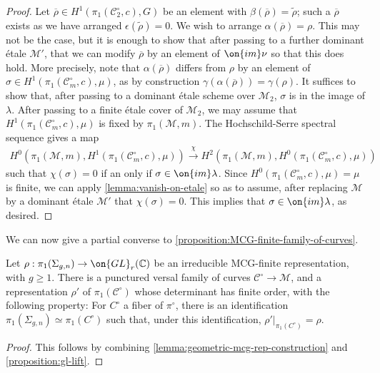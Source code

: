 \begin{proof}
Let $\overline{\rho} \in H^1(\pi_1(\mathscr C_2^\circ, c), G)$
be an element with $\beta(\overline{\rho}) = \widetilde{\rho}$; such a $\overline{\rho}$ exists as we have arranged $\epsilon(\widetilde{\rho})=0$.
We wish to arrange $\alpha(\overline{\rho}) =\rho$.
This may not be the case, but it is enough to show that after passing to a further dominant
\'etale $\mathscr M'$,
that we can modify $\overline{\rho}$ by an element of $\on{im}\nu$ so that this
does hold.
More precisely, note that $\alpha(\overline{\rho})$ differs from $\rho$ by an
element of $\sigma\in H^1(\pi_1(\mathscr{C}^\circ_m, c), \mu)$, as by
construction $\gamma(\alpha(\overline{\rho}))=\gamma(\rho)$. It suffices to show
that, after passing to a dominant \'etale scheme over $\mathscr{M}_2$, $\sigma$ is in the image of $\lambda$. After passing to a finite \'etale cover of $\mathscr{M}_2$, we may assume that $H^1(\pi_1(\mathscr{C}^\circ_m, c), \mu)$ is fixed by $\pi_1(\mathscr{M}, m)$.
The Hochschild-Serre spectral sequence gives a map
\begin{align*}
	H^0(\pi_1(\mathscr M, m), H^1(\pi_1({\mathscr C}_{m}^\circ,c), \mu))
\xrightarrow{\chi}
H^2(\pi_1(\mathscr M, m), H^0(\pi_1({\mathscr C}^\circ_{m}, c), \mu))
\end{align*}
such that $\chi(\sigma) = 0$ if an only if $\sigma \in \on{im}\lambda$.
Since $H^0(\pi_1({\mathscr C}^\circ_{m}, c), \mu)=\mu$
is finite, we can apply
\autoref{lemma:vanish-on-etale} so as to assume, after replacing $\mathscr M$ by
a dominant \'etale $\mathscr M'$
that $\chi(\sigma) = 0$.
This implies that $\sigma \in \on{im}\lambda$, as desired.
\end{proof}

We can now give a partial converse to \autoref{proposition:MCG-finite-family-of-curves}.
\begin{corollary}
\notready\label{corollary:converse-to-MCG-rep}
Let $\rho:\pi_1(\Sigma_{g,n})\to \on{GL}_r(\mathbb{C})$ be an irreducible MCG-finite
representation, with $g\geq 1$.
There is a punctured versal family of curves
$\mathscr{C}^\circ\to \mathscr{M}$, and a representation $\rho'$ of
$\pi_1(\mathscr{C}^\circ)$ whose determinant has finite order, with the following property: For $C^\circ$ a fiber of
$\pi^\circ$, there is an identification $\pi_1(\Sigma_{g,n})\simeq
\pi_1(C^\circ)$ such that, under this identification, $\rho'|_{\pi_1(C^\circ)}=\rho$.
\end{corollary}
\begin{proof}
	This follows by combining \autoref{lemma:geometric-mcg-rep-construction} and \autoref{proposition:gl-lift}.
\end{proof}


